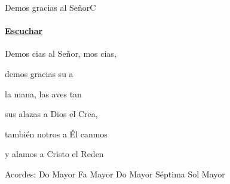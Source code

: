 \documentclass[12pt, spanish]{book}
\begin{document}
    \begin{song}{Demos gracias al Señor}{C}
        {} %
        {}
        {} %
        {}
        \ifChordBk
        \paragraph{\mbox{}\hfill\protect\href{https://open.spotify.com/intl-es/track/2ZcVBicMCi350sxdqR6jEq}{Escuchar}\mbox{}\hfill}
        \fi

        \begin{SBOpGroup}
            Demos cias al Señor, mos cias,

            demos gracias  su a
        \end{SBOpGroup}

        \begin{SBOpGroup}
             la mana, las aves tan

            sus alazas a Dios el Crea,

            también notros a Él canmos

            y alamos a Cristo el Reden
        \end{SBOpGroup}

        \ifChordBk
        \begin{SBOpGroup}
            Acordes:
            \upchord{\C}\qquad Do Mayor \hfill
            \upchord{\F}\qquad Fa Mayor \hfill\null\break
            \upchord{\Cseven}\qquad Do Mayor S\'eptima \hfill
            \upchord{\G}\qquad Sol Mayor \hfill\null\break
        \end{SBOpGroup}
        \fi
    \end{song}
\end{document}
